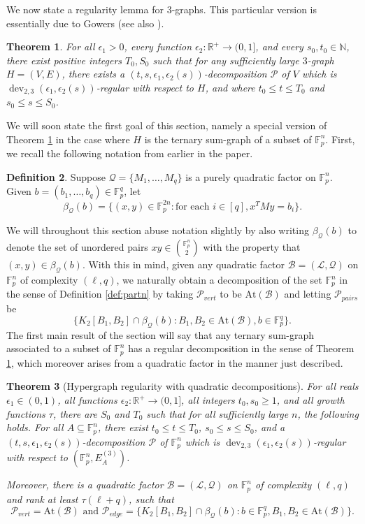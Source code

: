 \documentclass[12pt,oneside,british,a4wide]{amsart}
\newtheorem{theorem}{Theorem}[section]
\numberwithin{equation}{section}
\theoremstyle{definition}
\newtheorem{definition}[theorem]{Definition}
\def\F{\mathbb{F}}
\def\e{\epsilon}
\newcommand{\calL}{\mathcal{L}}
\newcommand{\calB}{\mathcal{B}}
\newcommand{\calP}{\mathcal{P}}
\newcommand{\calQ}{\mathcal{Q}}
\newcommand{\At}{{\mathrm{At}}}
\def\dev{\operatorname{dev}}
\begin{document}
We now state a regularity lemma for $3$-graphs. This particular version is essentially due to Gowers \cite{Gowers.20063gk} (see also  \cite[Theorem 1.1]{Nagle.2013}).

\begin{theorem}\label{thm:hgreg}
For all $\e_1>0$, every function $\e_2:\mathbb{R}^+\rightarrow (0,1]$, and every $s_0, t_0\in \mathbb{N}$, there exist positive integers $T_0,S_0$ such that for any sufficiently large $3$-graph $H=(V,E)$, there exists a $(t,s, \e_1,\e_2(s))$-decomposition $\calP$ of $V$ which is $\dev_{2,3}(\e_1,\e_2(s))$-regular with respect to $H$, and where $t_0\leq t \leq T_0$ and $s_0\leq s\leq S_0$.
\end{theorem}

We will soon state the first goal of this section, namely a special version of Theorem \ref{thm:hgreg} in the case where $H$ is the ternary sum-graph of a subset of $\F_p^n$.   First, we recall the following notation from earlier in the paper.  
 
 \begin{definition}\label{def:betaref}
 Suppose $\calQ=\{M_1,\ldots, M_q\}$ is a purely quadratic factor on $\F_p^n$. Given $b=(b_1,\ldots, b_q)\in \mathbb{F}_p^q$, let
$$
\beta_\calQ(b)=\{(x,y)\in \mathbb{F}_p^{2n}: \text{for each }i\in [q], x^TMy=b_i\}.
$$
\end{definition}

We will throughout this section abuse notation slightly by also writing $\beta_{\calQ}(b)$ to denote the set of unordered pairs $xy\in {\F_p^n\choose 2}$ with the property that $(x,y)\in \beta_{\calQ}(b)$.  With this in mind, given any quadratic factor $\calB=(\calL,\calQ)$ on $\F_p^n$ of complexity $(\ell,q)$, we naturally obtain a decomposition of the set $\F_p^n$ in the sense of Definition \ref{def:partn} by taking $\calP_{vert}$ to be $\At(\calB)$ and letting $\calP_{pairs}$ be 
$$
\{ K_2[B_1,B_2]\cap \beta_{\calQ}(b):B_1,B_2\in \At(\calB), b\in \F_p^q\}.  
$$
The first main result of the section will say that any ternary sum-graph associated to a subset of $\F_p^n$ has a regular decomposition in the sense of Theorem \ref{thm:hgreg}, which moreover arises from a quadratic factor in the manner just described.

\begin{theorem}[Hypergraph regularity with quadratic decompositions]\label{thm:hypergraphreg}
For all reals $\e_1\in (0,1)$, all functions $\e_2:\mathbb{R}^+\rightarrow (0,1]$, all integers $t_0,s_0\geq 1$, and all growth functions $\tau$, there are $S_0$ and $T_0$ such that for all sufficiently large $n$, the following holds.  For all $A\subseteq \F_p^n$, there exist  $t_0\leq t\leq T_0$, $s_0\leq s\leq S_0$, and a $(t,s,\e_1,\e_2(s))$-decomposition $\calP$ of $\F_p^n$ which is $\dev_{2,3}(\e_1,\e_2(s))$-regular with respect to $(\F_p^n, E_A^{(3)})$.

Moreover, there is a quadratic factor $\calB=(\calL,\calQ)$ on $\F_p^n$ of complexity $(\ell,q)$ and rank at least $\tau(\ell+q)$, such that 
$$
\calP_{vert}=\At(\calB)\text{ and }\calP_{edge}= \{K_2[B_1,B_2]\cap \beta_{\calQ}(b): b\in \F_p^{q}, B_1,B_2\in \At(\calB)\}.
$$
 \end{theorem}
 
\end{document}

